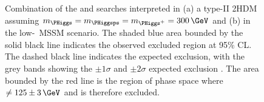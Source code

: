 \begin{figure}[h!]
\begin{center}
\caption[Combination of the \AtoZhtolltautau and \Htohhtobbtautau searches
interpreted in a type-II 2HDM and in the low-\tanb~MSSM scenario.]{Combination of the \AtoZhtolltautau and \Htohhtobbtautau searches
interpreted in (a) a type-II \ac{2HDM} assuming $m_{\PHiggs} = m_{\PHiggsps} = m_{\PHiggs^{+}} = 300\,\GeV$ and 
(b) in the low-\tanb~MSSM scenario. The shaded blue area bounded by
the solid black line indicates the observed excluded region at 95\% \ac{CL}.
The dashed black line indicates the expected exclusion, with the grey bands showing
the $\pm 1\sigma$ and $\pm2\sigma$ expected exclusion \cite{CMS-HIG-14-034}. The area
bounded by the red line is the region of phase space where \mh~$\neq 125 \pm 3\,\GeV$
 and is therefore excluded.}
\label{fig:HhhAZhMSSM2HDM}
\end{center}
\end{figure}
